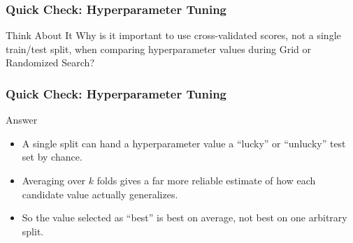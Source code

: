 \begin{frame}[fragile]\frametitle{Quick Check: Hyperparameter Tuning}
\begin{block}{Think About It}
Why is it important to use cross-validated scores, not a single train/test split, when comparing hyperparameter values during Grid or Randomized Search?
\end{block}
\end{frame}

\begin{frame}[fragile]\frametitle{Quick Check: Hyperparameter Tuning}
\begin{block}{Answer}
\begin{itemize}
\item A single split can hand a hyperparameter value a ``lucky'' or ``unlucky'' test set by chance.
\item Averaging over $k$ folds gives a far more reliable estimate of how each candidate value actually generalizes.
\item So the value selected as ``best'' is best on average, not best on one arbitrary split.
\end{itemize}
\end{block}
\end{frame}
